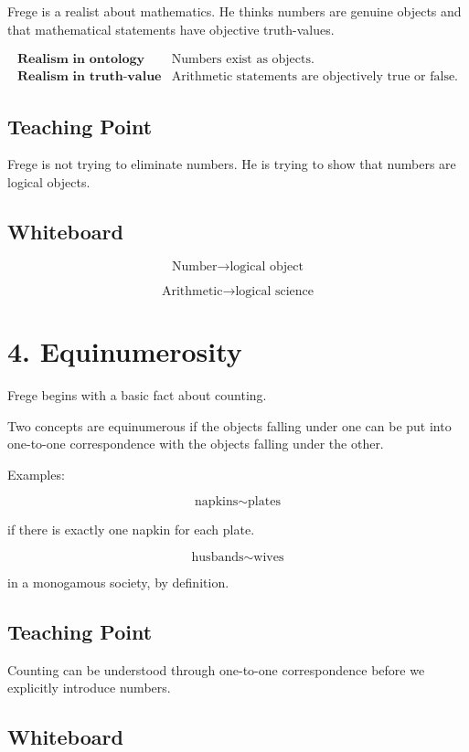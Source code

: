 \documentclass[11pt]{article}
\begin{document}
Frege is a realist about mathematics. He thinks numbers are genuine objects and that
mathematical statements have objective truth-values.

\[
\begin{array}{c|c}
\textbf{Realism in ontology} & \text{Numbers exist as objects.} \\
\textbf{Realism in truth-value} & \text{Arithmetic statements are objectively true or false.}
\end{array}
\]

\subsection*{Teaching Point}

Frege is not trying to eliminate numbers. He is trying to show that numbers are logical
objects.

\subsection*{Whiteboard}

\[
\text{Number} \rightarrow \text{logical object}
\]

\[
\text{Arithmetic} \rightarrow \text{logical science}
\]

\section*{4. Equinumerosity}

Frege begins with a basic fact about counting.

Two concepts are equinumerous if the objects falling under one can be put into one-to-one
correspondence with the objects falling under the other.

Examples:

\[
\text{napkins} \sim \text{plates}
\]

if there is exactly one napkin for each plate.

\[
\text{husbands} \sim \text{wives}
\]

in a monogamous society, by definition.

\subsection*{Teaching Point}

Counting can be understood through one-to-one correspondence before we explicitly
introduce numbers.

\subsection*{Whiteboard}
\end{document}
